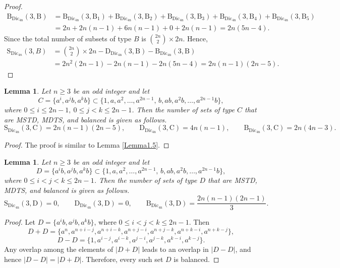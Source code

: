 \documentclass[11pt,reqno]{amsart}
\numberwithin{equation}{section}
\newtheorem{lemma}[theorem]{Lemma}
\begin{document}
\begin{proof}
\begin{align*}
\mathrm{B_{\mathrm{Dic_{4n}}}(3,B)}&=\mathrm{B_{\mathrm{Dic_{4n}}}(3,B_1)}+\mathrm{B_{\mathrm{Dic_{4n}}}(3,B_2)}+\mathrm{B_{\mathrm{Dic_{4n}}}(3,B_3)}+\mathrm{B_{\mathrm{Dic_{4n}}}(3,B_4)}+\mathrm{B_{\mathrm{Dic_{4n}}}(3,B_5)}\\&=2n+2n(n-1)+6n(n-1)+0+2n(n-1)=2n(5n-4).\end{align*}
Since the total number of subsets of type $B$ is $\binom{2n}{2}\times 2n$. Hence, 
\begin{align*}
    \mathrm{S}_{\mathrm{Dic}_{4n}}(3,B)&= \binom{2n}{2}\times 2n- \mathrm{D_{\mathrm{Dic_{4n}}}(3,B)}-\mathrm{B_{\mathrm{Dic_{4n}}}(3,B)}\\&=2n^{2}(2n-1)-2n(n-1)-2n(5n-4)=2n(n-1)(2n-5).
\end{align*}
\end{proof}
\begin{lemma}\label{Lemma1.6}
Let $n\geq3$ be an odd integer and let 
$$C=\{a^i,a^jb,a^kb\}\subset \{1,a,a^{2},\ldots,a^{2n-1},\, b,ab,a^{2}b,\ldots,a^{2n-1}b\},$$ where $0\leq i\leq 2n-1,~0\leq j<k\leq 2n-1$. Then the number of sets of type $C$ that are MSTD, MDTS, and balanced is given as follows.
$$\mathrm{S_{\mathrm{Dic_{4n}}}(3,C)}=2n(n-1)(2n-5),\qquad\mathrm{D_{\mathrm{Dic_{4n}}}(3,C)}=4n(n-1),\qquad\mathrm{B_{\mathrm{Dic_{4n}}}(3,C)}=2n(4n-3).$$
\end{lemma}
\begin{proof}
The proof is similar to Lemma \ref{Lemma1.5}.
\end{proof}
\begin{lemma}\label{Lemma1.7}
Let $n\geq3$ be an odd integer and let 
$$D=\{a^{i}b,a^{j}b,a^{k}b\}\subset \{1,a,a^{2},\ldots,a^{2n-1},\, b,ab,a^{2}b,\ldots,a^{2n-1}b\},$$ where $0 \leq i<j< k\leq 2n-1$. Then the number of sets of type $D$ that are MSTD, MDTS, and balanced is given as follows.
$$\mathrm{S_{\mathrm{Dic_{4n}}}(3,D)}=0,\qquad\mathrm{D_{\mathrm{Dic_{4n}}}(3,D)}=0,\qquad\mathrm{B_{\mathrm{Dic_{4n}}}(3,D)}=\frac{2n(n-1)(2n-1)}{3}.$$
\end{lemma}
\begin{proof}
 Let $D=\{a^{i}b,a^{j}b,a^{k}b\}$, where $0 \leq i<j< k\leq 2n-1$. Then
$$D+D=\{a^{n},a^{n+i-j},a^{n+i-k},a^{n+j-i},a^{n+j-k},a^{n+k-i},a^{n+k-j}\},$$ 
$$D-D=\{1,a^{i-j},a^{i-k},a^{j-i},a^{j-k},a^{k-i},a^{k-j}\}.$$
Any overlap among the elements of $|D+D|$ leads to an overlap in  $|D-D|$, and hence
$|D-D|=|D+D|.$ Therefore, every such set $D$ is balanced.
\end{proof}
\end{document}
